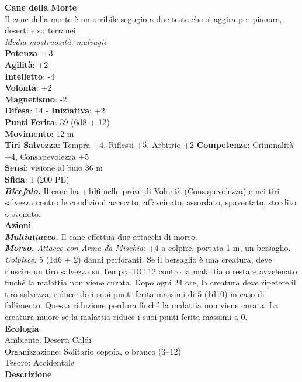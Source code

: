 \begin{multicols}{2}
\medskip\textbf{Cane della Morte}\\
Il cane della morte è un orribile segugio a due teste che si aggira per pianure, deserti e sotterranei.\\
\emph{Media mostruosità, malvagio}\\
\textbf{Potenza}: +3\\
\textbf{Agilità}: +2\\
\textbf{Intelletto}: -4\\
\textbf{Volontà}: +2\\
\textbf{Magnetismo}: -2\\
\textbf{Difesa}: 14 - \textbf{Iniziativa}: +2\\
\textbf{Punti Ferita}: 39 (6d8 + 12)\\
\textbf{Movimento}: 12 m\\
\textbf{Tiri Salvezza}: Tempra +4, Riflessi +5, Arbitrio +2 
\textbf{Competenze}: Criminalità +4, Consapevolezza +5\\
\textbf{Sensi}: visione al buio 36 m\\
\textbf{Sfida}: 1 (200 PE)\smallskip\\
\emph{\textbf{Bicefalo.}} Il cane ha +1d6 nelle prove di Volontà (Consapevolezza) e nei tiri salvezza contro le condizioni accecato, affascinato, assordato, spaventato, stordito o svenuto.\\
\smallskip\textbf{Azioni}\\
\emph{\textbf{Multiattacco.}} Il cane effettua due attacchi di morso.\\
\emph{\textbf{Morso.} Attacco con Arma da Mischia}: +4 a colpire, portata 1 m, un bersaglio.\\
\emph{Colpisce:} 5 (1d6 + 2) danni perforanti. Se il bersaglio è una creatura, deve riuscire un tiro salvezza su Tempra DC 12 contro la malattia o restare avvelenato finché la malattia non viene curata. Dopo ogni 24 ore, la creatura deve ripetere il tiro salvezza, riducendo i suoi punti ferita massimi di 5 (1d10) in caso di fallimento. Questa riduzione perdura finché la malattia non viene curata. La creatura muore se la malattia riduce i suoi punti ferita massimi a 0. \\
\textbf{Ecologia}\\
Ambiente: Deserti Caldi\\
Organizzazione: Solitario coppia, o branco (3–12)\\
Tesoro: Accidentale\\
\textbf{Descrizione}\\

\end{multicols}
